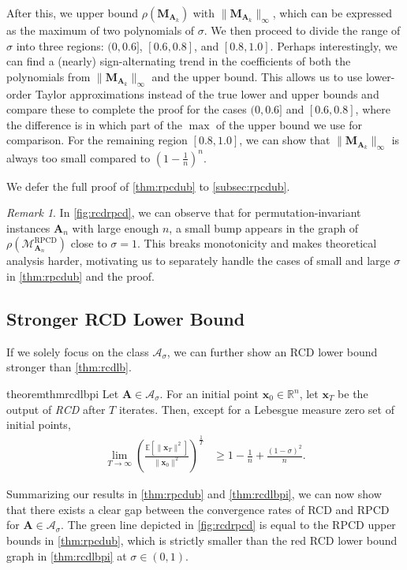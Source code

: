 \documentclass{article}
\theoremstyle{plain}
\theoremstyle{definition}
\theoremstyle{remark}
\newtheorem*{remark*}{Remark} %
\def\bigopen#1{\left(#1\right)}
\def\bigclosed#1{\left[#1\right]}
\def\vx{{\bm{x}}}
\def\mA{{\bm{A}}}
\def\mM{{\bm{M}}}
\def\gA{{\mathcal{A}}}
\def\gM{{\mathcal{M}}}
\newcommand{\E}{\mathbb{E}}
\newcommand{\R}{\mathbb{R}}
\begin{document}
After this, we upper bound $\rho(\mM_{\mA_k})$ with $\| \mM_{\mA_k} \|_{\infty}$, which can be expressed as the maximum of two polynomials of $\sigma$.
We then proceed to divide the range of $\sigma$ into three regions: $(0, 0.6]$, $[0.6, 0.8]$, and $[0.8, 1.0]$.
Perhaps interestingly, we can find a (nearly) sign-alternating trend in the coefficients of both the polynomials from $\| \mM_{\mA_k} \|_{\infty}$ and the upper bound.
This allows us to use lower-order Taylor approximations instead of the true lower and upper bounds and compare these to complete the proof for the cases $(0, 0.6]$ and $[0.6, 0.8]$, where the difference is in which part of the $\max$ of the upper bound we use for comparison.
For the remaining region $[0.8, 1.0]$, we can show that $\| \mM_{\mA_k} \|_{\infty}$ is always too small compared to $\bigopen{1 - \frac{1}{n}}^n$.

We defer the full proof of \cref{thm:rpcdub} to \cref{subsec:rpcdub}.

\begin{remark*}
    In \cref{fig:rcdrpcd}, we can observe that for permutation-invariant instances $\mA_{n}$ with large enough $n$, a small bump appears in the graph of $\rho(\gM_{\mA_{n}}^{\text{RPCD}})$ close to $\sigma = 1$.
    This breaks monotonicity and makes theoretical analysis harder, motivating us to separately handle the cases of small and large $\sigma$ in \cref{thm:rpcdub} and the proof.
\end{remark*}

\subsection{Stronger RCD Lower Bound}
If we solely focus on the class $\gA_{\sigma}$, we can further show an RCD lower bound stronger than \cref{thm:rcdlb}.
\begin{restatable}{theorem}{thmrcdlbpi}
    \label{thm:rcdlbpi}
    Let $\mA \in \gA_{\sigma}$. For an initial point $\vx_0\in \R^{n}$, let $\vx_T$ be the output of \emph{RCD} after $T$ iterates. Then, except for a Lebesgue measure zero set of initial points, 
    \begin{align*}
        \lim_{T \to \infty} \bigopen{\frac{\E\bigclosed{\|\vx_T\|^2}}{\|\vx_0\|^2}}^{\frac{1}{T}} \!\! &\ge  1 - \frac{1}{n} + \frac{(1 - \sigma)^2}{n}.
    \end{align*}
\end{restatable}

Summarizing our results in \cref{thm:rpcdub} and \cref{thm:rcdlbpi}, we can now show that there exists a clear gap between the convergence rates of RCD and RPCD for $\mA \in \gA_{\sigma}$.
The green line depicted in \cref{fig:rcdrpcd} is equal to the RPCD upper bounds in \cref{thm:rpcdub}, which is strictly smaller than the red RCD lower bound graph in \cref{thm:rcdlbpi} at $\sigma \in (0, 1)$.
\end{document}
